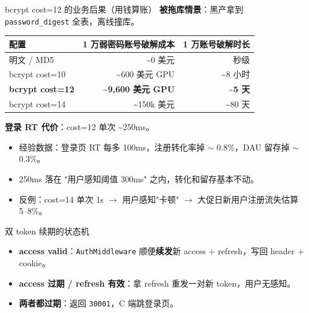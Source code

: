 \documentclass[aspectratio=169,11pt]{beamer}
\begin{document}
\begin{frame}[shrink]{bcrypt cost=12 的业务后果（用钱算账）}
\textbf{被拖库情景}：黑产拿到 \texttt{password\_digest} 全表，离线撞库。
\begin{tabular}{@{}lrr@{}}
\toprule
配置 & 1 万弱密码账号破解成本 & 1 万账号破解时长 \\
\midrule
明文 / MD5         & \textasciitilde 0 美元   & 秒级 \\
bcrypt cost=10     & \textasciitilde 600 美元 GPU & \textasciitilde 8 小时 \\
\textbf{bcrypt cost=12} & \textbf{\textasciitilde 9{,}600 美元 GPU} & \textbf{\textasciitilde 5 天} \\
bcrypt cost=14     & \textasciitilde 150k 美元 & \textasciitilde 80 天 \\
\bottomrule
\end{tabular}
\vspace{2mm}
\textbf{登录 RT 代价}：cost=12 单次 \textasciitilde 250ms。
\begin{itemize}
  \item 经验数据：登录页 RT 每多 100ms，注册转化率掉 \(\sim\) 0.8\%，DAU 留存掉 \(\sim\) 0.3\%。
  \item 250ms 落在 "用户感知阈值 300ms" 之内，转化和留存基本不动。
  \item 反例：cost=14 单次 1s \(\to\) 用户感知"卡顿" \(\to\) 大促日新用户注册流失估算 5--8\%。
\end{itemize}
\end{frame}

\begin{frame}[shrink]{双 token 续期的状态机}
\vspace{2mm}
\begin{itemize}
  \item \textbf{access valid}：\texttt{AuthMiddleware} 顺便\textbf{续发}新 access + refresh，写回 header + cookie。
  \item \textbf{access 过期 / refresh 有效}：拿 refresh 重发一对新 token，用户无感知。
  \item \textbf{两者都过期}：返回 \texttt{30001}，C 端跳登录页。
\end{itemize}
\end{frame}
\end{document}
